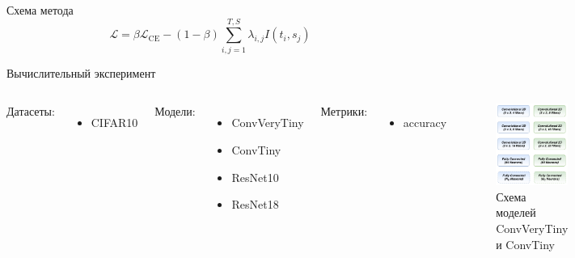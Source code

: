 \documentclass{beamer}
\begin{document}
\begin{frame}{Схема метода}
    \begin{equation}
        \mathcal{L} = \beta \mathcal{L}_\text{CE} - (1 - \beta){\sum_{i, j=1}^{T, S}\lambda_{i, j}I(t_{i}, s_{j})}
    \end{equation}


\end{frame}



\begin{frame}{Вычислительный эксперимент}
    \begin{columns}[c]
        Датасеты:
        \begin{itemize}
            \item CIFAR10
        \end{itemize}
        Модели:
        \begin{itemize}
            \item ConvVeryTiny
            \item ConvTiny
            \item ResNet10
            \item ResNet18
        \end{itemize}
        Метрики:
        \begin{itemize}
            \item accuracy
        \end{itemize}
        \begin{figure}
            \includegraphics[width=1.0\textwidth]{conv_scheme.png}
            \caption{Схема моделей ConvVeryTiny и ConvTiny}
        \end{figure}
    \end{columns}
\end{frame}
\end{document}
